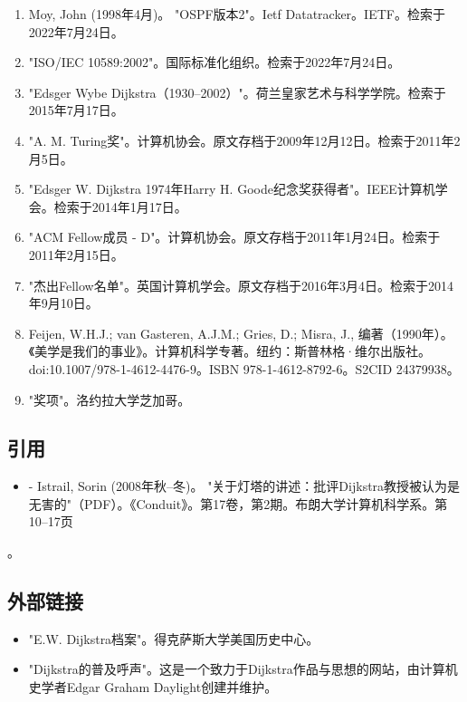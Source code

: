 \begin{enumerate}
\item Moy, John (1998年4月)。 "OSPF版本2"。Ietf Datatracker。IETF。检索于2022年7月24日。
\item "ISO/IEC 10589:2002"。国际标准化组织。检索于2022年7月24日。
\item "Edsger Wybe Dijkstra（1930–2002）"。荷兰皇家艺术与科学学院。检索于2015年7月17日。
\item "A. M. Turing奖"。计算机协会。原文存档于2009年12月12日。检索于2011年2月5日。
\item "Edsger W. Dijkstra 1974年Harry H. Goode纪念奖获得者"。IEEE计算机学会。检索于2014年1月17日。
\item "ACM Fellow成员 - D"。计算机协会。原文存档于2011年1月24日。检索于2011年2月15日。
\item "杰出Fellow名单"。英国计算机学会。原文存档于2016年3月4日。检索于2014年9月10日。
\item Feijen, W.H.J.; van Gasteren, A.J.M.; Gries, D.; Misra, J., 编著（1990年）。《美学是我们的事业》。计算机科学专著。纽约：斯普林格·维尔出版社。doi:10.1007/978-1-4612-4476-9。ISBN 978-1-4612-8792-6。S2CID 24379938。
\item "奖项"。洛约拉大学芝加哥。
\end{enumerate}
\subsection{引用}
\begin{itemize}
\item - Istrail, Sorin (2008年秋–冬)。 "关于灯塔的讲述：批评Dijkstra教授被认为是无害的"（PDF）。《Conduit》。第17卷，第2期。布朗大学计算机科学系。第10–17页
\end{itemize}。
\subsection{外部链接}
\begin{itemize}
\item "E.W. Dijkstra档案"。得克萨斯大学美国历史中心。
\item "Dijkstra的普及呼声"。这是一个致力于Dijkstra作品与思想的网站，由计算机史学者Edgar Graham Daylight创建并维护。
\end{itemize}